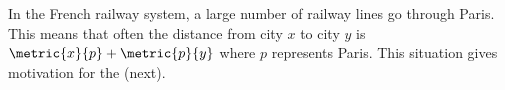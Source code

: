 In the French railway system, a large number of railway lines go through Paris.
This means that often the distance from city $x$ to city $y$ is
$\metric{x}{p} + \metric{p}{y}$ where $p$ represents Paris.
This situation gives motivation for the  (next).




